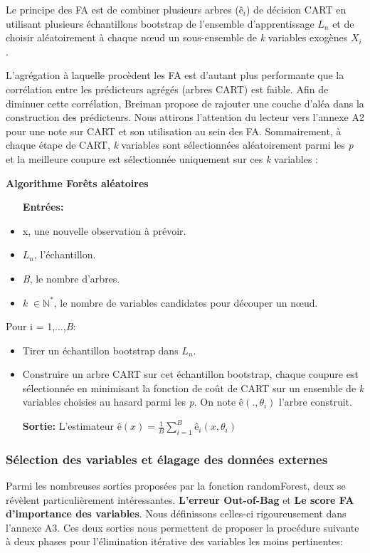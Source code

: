 	Le principe des FA est de combiner plusieurs arbres ($ê_i$) de décision CART\cite{BREI84} en utilisant plusieurs échantillons bootstrap de l'ensemble d'apprentissage \textbf{$L_n$} et de choisir aléatoirement à chaque nœud un sous-ensemble de \textit{k} variables exogènes $X_i$. 
	\par
	L'agrégation à laquelle procèdent les FA est d’autant plus performante que la corrélation entre les prédicteurs agrégés  (arbres CART) est faible. Afin de diminuer cette corrélation, Breiman\cite{BREI01} propose de rajouter une couche d’aléa dans la construction des
	prédicteurs.  Nous attirons l'attention du lecteur vers l'annexe A2 pour une note sur CART et son utilisation au sein des FA. Sommairement, à chaque étape de CART, \textit{k} variables sont sélectionnées aléatoirement parmi les \textit{p} et la meilleure coupure est sélectionnée uniquement sur ces \textit{k} variables : \par
	\textbf{Algorithme Forêts aléatoires}
	\begin{itemize}
	\item[\textbf{Entrées:}]
	\item x, une nouvelle observation à prévoir.
	\item \textit{$L_n$}, l'échantillon.
	\item \textit{B}, le nombre d'arbres.
	\item \textit{k} $\in \mathbb{N}^* $, le nombre de variables candidates pour découper un nœud.
	\end{itemize}
	Pour i = 1,...,\textit{B}:
	\begin{itemize}
	\item Tirer un échantillon bootstrap dans \textit{$L_n$}.
	\item Construire un arbre CART sur cet échantillon bootstrap, chaque coupure est sélectionnée
	en minimisant la fonction de coût de CART sur un ensemble de \textit{k} variables choisies au
	hasard parmi les \textit{p}. On note $ê(.,\theta_i)$ l’arbre construit.
	\item[\textbf{Sortie:}]L’estimateur ${ê(x) =  \frac{1}{B} \sum_{i=1}^{B} ê_i(x,\theta_i)}$
	\end{itemize}	
	\subsubsection{Sélection des variables et élagage des données externes}
	Parmi les nombreuses sorties proposées par la fonction randomForest, deux se révèlent particulièrement intéressantes. \textbf{L'erreur Out-of-Bag} et \textbf{Le score FA d'importance des variables}. Nous définissons celles-ci rigoureusement dans l'annexe A3. Ces deux sorties nous permettent de proposer la procédure suivante à deux phases pour l'élimination itérative des variables les moins pertinentes:
